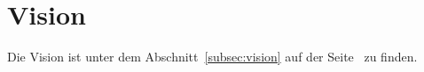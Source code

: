 \section{Vision}
Die Vision ist unter dem Abschnitt~\ref{subsec:vision} auf der Seite~\pageref{subsec:vision} zu finden.